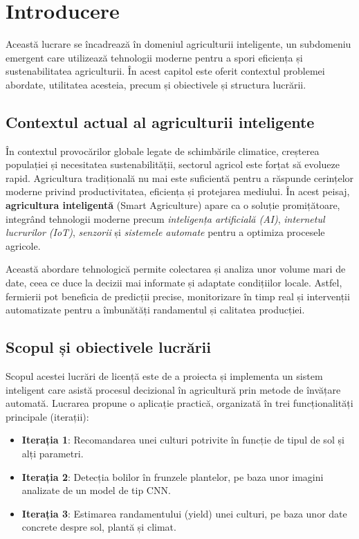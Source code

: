 \documentclass[runningheads,a4paper,11pt,twoside]{report}
\begin{document}
\newpage
{}

\chapter{Introducere}
Această lucrare se încadrează în domeniul agriculturii inteligente, un subdomeniu emergent care utilizează tehnologii moderne pentru a spori eficiența și sustenabilitatea agriculturii. În acest capitol este oferit contextul problemei abordate, utilitatea acesteia, precum și obiectivele și structura lucrării.

\section{Contextul actual al agriculturii inteligente}
În contextul provocărilor globale legate de schimbările climatice, creșterea populației și necesitatea sustenabilității, sectorul agricol este forțat să evolueze rapid. Agricultura tradițională nu mai este suficientă pentru a răspunde cerințelor moderne privind productivitatea, eficiența și protejarea mediului. În acest peisaj, \textbf{agricultura inteligentă} (Smart Agriculture) apare ca o soluție promițătoare, integrând tehnologii moderne precum \textit{inteligența artificială (AI)}, \textit{internetul lucrurilor (IoT)}, \textit{senzorii} și \textit{sistemele automate} pentru a optimiza procesele agricole.

Această abordare tehnologică permite colectarea și analiza unor volume mari de date, ceea ce duce la decizii mai informate și adaptate condițiilor locale. Astfel, fermierii pot beneficia de predicții precise, monitorizare în timp real și intervenții automatizate pentru a îmbunătăți randamentul și calitatea producției.

\section{Scopul și obiectivele lucrării}
Scopul acestei lucrări de licență este de a proiecta și implementa un sistem inteligent care asistă procesul decizional în agricultură prin metode de învățare automată. Lucrarea propune o aplicație practică, organizată în trei funcționalități principale (iterații):

\begin{itemize}
  \item \textbf{Iterația 1}: Recomandarea unei culturi potrivite în funcție de tipul de sol și alți parametri.
  \item \textbf{Iterația 2}: Detecția bolilor în frunzele plantelor, pe baza unor imagini analizate de un model de tip CNN.
  \item \textbf{Iterația 3}: Estimarea randamentului (yield) unei culturi, pe baza unor date concrete despre sol, plantă și climat.
\end{itemize}
\end{document}
